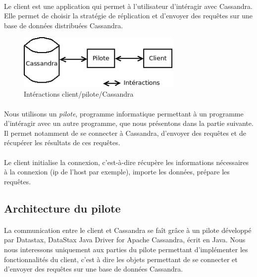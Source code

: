 \documentclass[12pt]{article}
\begin{document}
\paragraph{} Le client est une application qui permet à l'utilisateur d'intéragir avec Cassandra. 
Elle permet de choisir la stratégie de réplication et d'envoyer des requêtes sur une base de données distribuées Cassandra.

\begin{figure}[H]
	\centering
		\includegraphics[width=8cm]{schemas/pilote.png}
	\caption{Intéractions client/pilote/Cassandra \label{fig:pilote}}
\end{figure}

\paragraph{} Nous utilisons un \textit{pilote}, programme informatique permettant à un programme d'intéragir avec un autre programme, que nous présentons dans la partie suivante.
Il permet notamment de se connecter à Cassandra, d'envoyer des requêtes et de récupérer les résultats de ces requêtes.

\paragraph{} Le client initialise la connexion, c'est-à-dire récupère les informations nécessaires à la connexion (ip de l'host par exemple), importe les données, prépare les requêtes.


\subsection{Architecture du pilote}

\paragraph{} La communication entre le client et Cassandra se faît grâce à un pilote développé par Datastax, DataStax Java Driver for Apache Cassandra, écrit en Java.
Nous nous interessons uniquement aux parties du pilote permettant d'implémenter les fonctionnalités du client, c'est à dire les objets permettant de se connecter et d'envoyer des requêtes sur une base de données Cassandra.
\end{document}
